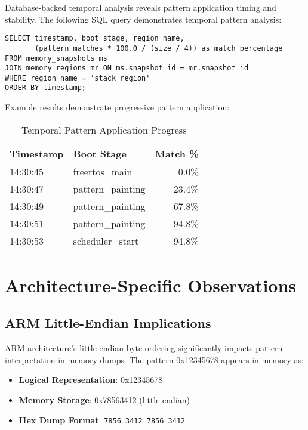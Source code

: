 \documentclass[11pt,a4paper]{article}
\begin{document}
Database-backed temporal analysis reveals pattern application timing and stability. The following SQL query demonstrates temporal pattern analysis:

\begin{lstlisting}[style=sql, caption=Temporal Pattern Evolution Analysis]
SELECT timestamp, boot_stage, region_name,
       (pattern_matches * 100.0 / (size / 4)) as match_percentage
FROM memory_snapshots ms
JOIN memory_regions mr ON ms.snapshot_id = mr.snapshot_id
WHERE region_name = 'stack_region'
ORDER BY timestamp;
\end{lstlisting}

Example results demonstrate progressive pattern application:

\begin{table}[H]
\centering
\small
\begin{tabular}{@{}llr@{}}
\toprule
\textbf{Timestamp} & \textbf{Boot Stage} & \textbf{Match \%} \\
\midrule
14:30:45 & freertos\_main    & 0.0\% \\
14:30:47 & pattern\_painting & 23.4\% \\
14:30:49 & pattern\_painting & 67.8\% \\
14:30:51 & pattern\_painting & 94.8\% \\
14:30:53 & scheduler\_start  & 94.8\% \\
\bottomrule
\end{tabular}
\caption{Temporal Pattern Application Progress}
\label{tab:temporal_progress}
\end{table}

\section{Architecture-Specific Observations}

\subsection{ARM Little-Endian Implications}

ARM architecture's little-endian byte ordering significantly impacts pattern interpretation in memory dumps. The pattern 0x12345678 appears in memory as:

\begin{itemize}
    \item \textbf{Logical Representation}: 0x12345678
    \item \textbf{Memory Storage}: 0x78563412 (little-endian)
    \item \textbf{Hex Dump Format}: \texttt{7856 3412 7856 3412}
\end{itemize}
\end{document}
